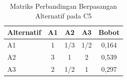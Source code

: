 \begin{table}[h]
\centering
\caption{Matriks Perbandingan Berpasangan Alternatif pada C5}
\label{tab:ahp-alt-c5}
\begin{tabular}{|l|c|c|c|c|}
\hline
\textbf{Alternatif} & \textbf{A1} & \textbf{A2} & \textbf{A3} & \textbf{Bobot} \\
\hline
A1             & 1     & 1/3   & 1/2   & 0,164 \\
A2             & 3     & 1     & 2     & 0,539 \\
A3             & 2     & 1/2   & 1     & 0,297 \\
\hline
\end{tabular}
\end{table}